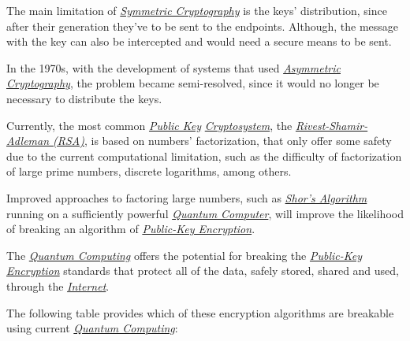 \documentclass[conference]{IEEEtran}
\begin{document}
\vspace{4pt}

The main limitation of \href{https://en.wikipedia.org/wiki/Symmetric-key_algorithm}{\textit{Symmetric Cryptography}} is the keys' distribution, since after their generation they've to be sent to the endpoints. Although, the message with the key can also be intercepted and would need a secure means to be sent.

\vspace{4pt}

In the 1970s, with the development of systems that used \href{https://en.wikipedia.org/wiki/Public-key_cryptography}{\textit{Asymmetric Cryptography}}, the problem became semi-resolved, since it would no longer be necessary to distribute the keys.

\vspace{4pt}

Currently, the most common \href{https://en.wikipedia.org/wiki/Public-key_cryptography}{\textit{Public Key}} \href{https://en.wikipedia.org/wiki/Cryptosystem}{\textit{Cryptosystem}}, the \href{https://en.wikipedia.org/wiki/RSA_(cryptosystem)}{\textit{Rivest-Shamir-Adleman (RSA)}}, is based on numbers' factorization, that only offer some safety due to the current computational limitation, such as the difficulty of factorization of large prime numbers, discrete logarithms, among others.

\vspace{4pt}

Improved approaches to factoring large numbers, such as \href{https://en.wikipedia.org/wiki/Shor\%27s_algorithm}{\textit{Shor's Algorithm}} running on a sufficiently powerful \href{https://en.wikipedia.org/wiki/Quantum_computing}{\textit{Quantum Computer}}, will improve the likelihood of breaking an algorithm of \href{https://en.wikipedia.org/wiki/Public-key_cryptography}{\textit{Public-Key Encryption}}.

\vspace{4pt}

The \href{https://en.wikipedia.org/wiki/Quantum_computing}{\textit{Quantum Computing}} offers the potential for breaking the \href{https://en.wikipedia.org/wiki/Public-key_cryptography}{\textit{Public-Key Encryption}} standards that protect all of the data, safely stored, shared and used, through the \href{https://en.wikipedia.org/wiki/Internet}{\textit{Internet}}.

\vspace{4pt}

The following table provides which of these encryption algorithms are breakable using current \href{https://en.wikipedia.org/wiki/Quantum_computing}{\textit{Quantum Computing}}:
\end{document}
